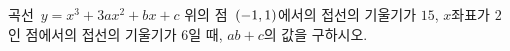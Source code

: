 곡선~$y=x^3+3ax^2+bx+c$ 위의 점~$(-1{,}\mkern3mu\mathopen{}1)$에서의 접선의 기울기가 $15$, $x$좌표가 $2$인 점에서의 접선의 기울기가 $6$일 때, $ab+c$의 값을 구하시오. 
